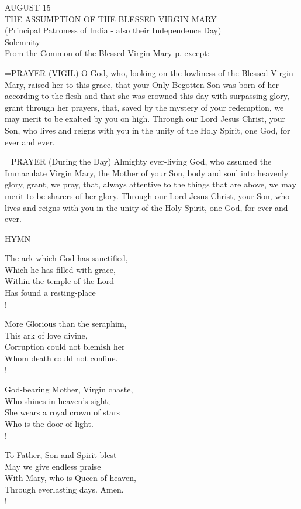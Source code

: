 \begin{center}\normalsize AUGUST 15\\
\footnotesize THE ASSUMPTION OF THE BLESSED VIRGIN MARY\\
\footnotesize (Principal Patroness of India - also their Independence Day)\\
\footnotesize Solemnity\\
\footnotesize From the Common of the Blessed Virgin Mary p.    except:\\
\end{center}

\hangindent=\parindent \small{PRAYER 
(VIGIL)
O God, who, looking on the lowliness of the Blessed Virgin Mary,
raised her to this grace,
that your Only Begotten Son was born of her according to the flesh
and that she was crowned this day with surpassing glory,
grant through her prayers,
that, saved by the mystery of your redemption,
we may merit to be exalted by you on high.
Through our Lord Jesus Christ, your Son,
who lives and reigns with you in the unity of the Holy Spirit,
one God, for ever and ever.\\}
 
\hangindent=\parindent \small{PRAYER 
(During the Day)
Almighty ever-living God,
who assumed the Immaculate Virgin Mary, the Mother of your Son,
body and soul into heavenly glory,
grant, we pray,
that, always attentive to the things that are above,
we may merit to be sharers of her glory.
Through our Lord Jesus Christ, your Son,
who lives and reigns with you in the unity of the Holy Spirit,
one God, for ever and ever.\\}
 

\noindent\small{\uppercase{Hymn}}\normalsize\label{assumption:hymn}
\begin{cverse}
The ark which God has sanctified,\\
Which he has filled with grace,\\
Within the temple of the Lord\\
Has found a resting-place\\!

More Glorious than the seraphim,\\
This ark of love divine,\\
Corruption could not blemish her\\
Whom death could not confine.\\!

God-bearing Mother, Virgin chaste,\\
Who shines in heaven’s sight;\\
She wears a royal crown of stars\\
Who is the door of light.\\!

To Father, Son and Spirit blest\\
May we give endless praise\\
With Mary, who is Queen of heaven,\\
Through everlasting days. Amen.\\!
\end{cverse}

